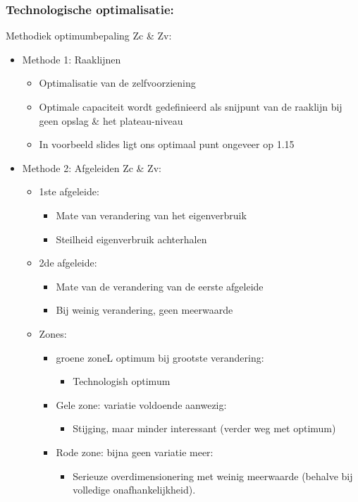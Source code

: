 \documentclass[12pt]{article}
\begin{document}
\subsubsection{Technologische optimalisatie:}
Methodiek optimumbepaling Zc \& Zv:\begin{itemize}
    \item Methode 1: Raaklijnen\begin{itemize}
        \item Optimalisatie van de zelfvoorziening 
        \item Optimale capaciteit wordt gedefinieerd als snijpunt van de raaklijn bij geen opslag \& het plateau-niveau
        \item In voorbeeld slides ligt ons optimaal punt ongeveer op 1.15
    \end{itemize}
    \item Methode 2: Afgeleiden Zc \& Zv:\begin{itemize}
        \item 1ste afgeleide:\begin{itemize}
            \item Mate van verandering van het eigenverbruik 
            \item Steilheid eigenverbruik achterhalen
        \end{itemize}
        \item 2de afgeleide:\begin{itemize}
            \item Mate van de verandering van de eerste afgeleide 
            \item Bij weinig verandering, geen meerwaarde
        \end{itemize}
        \item Zones:\begin{itemize}
            \item groene zoneL optimum bij grootste verandering:\begin{itemize}
                \item Technologish optimum 
            \end{itemize}
            \item Gele zone: variatie voldoende aanwezig:\begin{itemize}
                \item Stijging, maar minder interessant (verder weg met optimum)
            \end{itemize}
            \item Rode zone: bijna geen variatie meer:\begin{itemize}
                \item Serieuze overdimensionering met weinig meerwaarde (behalve bij volledige onafhankelijkheid).
            \end{itemize}
        \end{itemize}
    \end{itemize}
\end{itemize}
\end{document}
